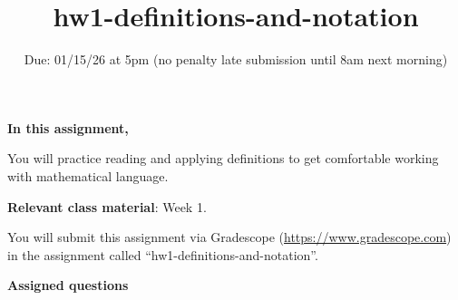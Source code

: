 

\title{hw1-definitions-and-notation}
\date{Due: 01/15/26 at 5pm (no penalty late submission until 8am next morning)}

\maketitle
\thispagestyle{fancy}


{\bf In this assignment,}

You will practice reading and
applying definitions to get comfortable working with mathematical language.

{\bf Relevant class material}: Week 1.

You will submit this assignment via Gradescope
(\href{https://www.gradescope.com}{https://www.gradescope.com}) 
in the assignment called ``hw1-definitions-and-notation''.

\instructions


{\bf Assigned questions}

